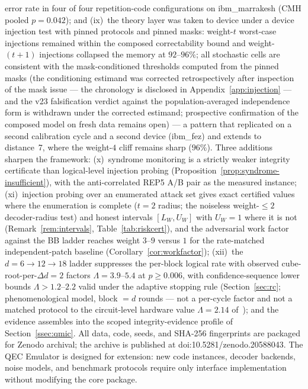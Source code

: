 \documentclass[11pt,a4paper]{article}
\begin{document}
error rate in four of four repetition-code configurations on
ibm\_marrakesh (CMH pooled $p=0.042$);
and (ix)~the theory layer was taken to device under a device injection
test with pinned protocols and pinned masks:
weight-$t$ worst-case injections remained within the composed
correctability bound and weight-$(t{+}1)$ injections collapsed the memory
at $92$--$96\%$; all stochastic cells are consistent with the
mask-conditioned thresholds computed from the pinned masks (the
conditioning estimand was corrected retrospectively after inspection of
the mask issue --- the chronology is disclosed in
Appendix~\ref{app:injection} --- and the v23 falsification verdict
against the population-averaged independence form is withdrawn under
the corrected estimand; prospective confirmation of the composed model
on fresh data remains open)
--- a pattern that replicated on a second calibration cycle and a second
device (ibm\_fez) and extends to distance~7, where the weight-$4$
cliff remains sharp ($96\%$).
Three additions sharpen the framework: (x)~syndrome monitoring is a
strictly weaker integrity certificate than logical-level injection
probing (Proposition~\ref{prop:syndrome-insufficient}), with the
anti-correlated REP5 A/B pair as the measured instance; (xi)~injection
probing over an enumerated attack set gives exact certified values where
the enumeration is complete ($t=2$ radius; the noiseless weight-$\le2$
decoder-radius test) and honest intervals $[L_W,U_W]$ with $U_W=1$
where it is not (Remark~\ref{rem:intervals},
Table~\ref{tab:riskcert}), and the adversarial work factor
against the BB ladder reaches weight $3$--$9$ versus $1$ for the
rate-matched independent-patch baseline (Corollary~\ref{cor:workfactor});
(xii)~the $d=6{\to}12{\to}18$ ladder suppresses the per-block logical
rate with observed cube-root-per-$\Delta d{=}2$ factors
$\Lambda=3.9$--$5.4$ at $p\ge0.006$, with confidence-sequence lower
bounds $\Lambda>1.2$--$2.2$ valid under the adaptive stopping rule
(Section~\ref{sec:rc}; phenomenological model,
block $=d$ rounds --- not a per-cycle factor and not a matched
protocol to the circuit-level hardware value $\Lambda=2.14$
of~\cite{Acharya2024lambda}); and the
evidence assembles into the scoped integrity-evidence profile of
Section~\ref{ssec:qmic}.
All data, code, seeds, and SHA-256 fingerprints are packaged for Zenodo archival; the archive is published at doi:10.5281/zenodo.20588043.
The QEC Emulator is designed for extension: new code instances, decoder
backends, noise models, and benchmark protocols require only interface
implementation without modifying the core package.
\end{document}
